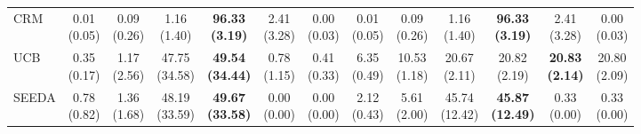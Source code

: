 {\begin{tabular}{l|cccccc|cccccc}
CRM & \makecell{0.01 \\ (0.05)} & \makecell{0.09 \\ (0.26)} & {\cellcolor[HTML]{C8E6C9}} \makecell{1.16 \\ (1.40)} & \bfseries \makecell{96.33 \\ (3.19)} & \makecell{2.41 \\ (3.28)} & \makecell{0.00 \\ (0.03)} & \makecell{0.01 \\ (0.05)} & \makecell{0.09 \\ (0.26)} & {\cellcolor[HTML]{C8E6C9}} \makecell{1.16 \\ (1.40)} & \bfseries \makecell{96.33 \\ (3.19)} & \makecell{2.41 \\ (3.28)} & \makecell{0.00 \\ (0.03)} \\
UCB & \makecell{0.35 \\ (0.17)} & \makecell{1.17 \\ (2.56)} & {\cellcolor[HTML]{C8E6C9}} \makecell{47.75 \\ (34.58)} & \bfseries \makecell{49.54 \\ (34.44)} & \makecell{0.78 \\ (1.15)} & \makecell{0.41 \\ (0.33)} & \makecell{6.35 \\ (0.49)} & \makecell{10.53 \\ (1.18)} & {\cellcolor[HTML]{C8E6C9}} \makecell{20.67 \\ (2.11)} & \makecell{20.82 \\ (2.19)} & \bfseries \makecell{20.83 \\ (2.14)} & \makecell{20.80 \\ (2.09)} \\
SEEDA & \makecell{0.78 \\ (0.82)} & \makecell{1.36 \\ (1.68)} & {\cellcolor[HTML]{C8E6C9}} \makecell{48.19 \\ (33.59)} & \bfseries \makecell{49.67 \\ (33.58)} & \makecell{0.00 \\ (0.00)} & \makecell{0.00 \\ (0.00)} & \makecell{2.12 \\ (0.43)} & \makecell{5.61 \\ (2.00)} & {\cellcolor[HTML]{C8E6C9}} \makecell{45.74 \\ (12.42)} & \bfseries \makecell{45.87 \\ (12.49)} & \makecell{0.33 \\ (0.00)} & \makecell{0.33 \\ (0.00)} \\

\end{tabular}}
